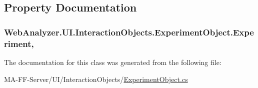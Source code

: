 \subsection{Property Documentation}
\hypertarget{class_web_analyzer_1_1_u_i_1_1_interaction_objects_1_1_experiment_object_a2b87e06b55663703f1017c95c19bfa29}{}
\subsubsection[{Experiment}]{ Web\+Analyzer.\+U\+I.\+Interaction\+Objects.\+Experiment\+Object.\+Experiment\hspace{0.3cm}{\ttfamily [get]}, {\ttfamily [set]}}\label{class_web_analyzer_1_1_u_i_1_1_interaction_objects_1_1_experiment_object_a2b87e06b55663703f1017c95c19bfa29}


The documentation for this class was generated from the following file\+:\begin{DoxyCompactItemize}
\item 
M\+A-\/\+F\+F-\/\+Server/\+U\+I/\+Interaction\+Objects/\hyperlink{_experiment_object_8cs}{Experiment\+Object.\+cs}\end{DoxyCompactItemize}
